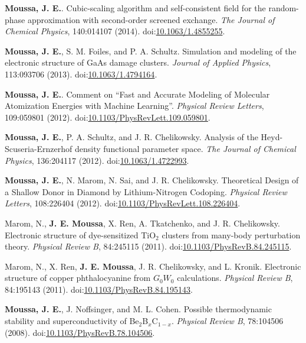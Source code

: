 \documentclass[10pt]{article}
\makeatletter
\newlength{\bibhang}
\newlength{\bibsep}
 {\@listi \global\bibsep\itemsep \global\advance\bibsep by\parsep}
\newenvironment{bibsection}%
        {\vspace{-1.6\baselineskip}\begin{etaremune}[leftmargin=1.6em]{%
       \setlength{\leftmargin}{\bibhang}%
       \setlength{\itemindent}{-\leftmargin}%
       \setlength{\itemsep}{\bibsep}%
       \setlength{\parsep}{\z@}%
        \setlength{\partopsep}{0pt}%
        \setlength{\topsep}{0pt}}}
        {\end{etaremune}\vspace{-.6\baselineskip}}
\newcommand\doilink[1]{\href{http://dx.doi.org/#1}{#1}}
\newcommand\doi[1]{doi:\doilink{#1}}
\makeatother
\begin{document}
\begin{bibsection}
    \item \textbf{Moussa, J. E.}. Cubic-scaling algorithm and self-consistent field for the random-phase approximation with second-order screened exchange.
     \emph{The Journal of Chemical Physics}, 140:014107 (2014). \doi{10.1063/1.4855255}.

    \item \textbf{Moussa, J. E.}, S. M. Foiles, and P. A. Schultz.
         Simulation and modeling of the electronic structure of GaAs damage clusters.
         \emph{Journal of Applied Physics}, 113:093706 (2013). \doi{10.1063/1.4794164}.

    \item \textbf{Moussa, J. E.}.
         Comment on ``Fast and Accurate Modeling of Molecular Atomization Energies with Machine Learning''.
         \emph{Physical Review Letters}, 109:059801 (2012). \doi{10.1103/PhysRevLett.109.059801}.

    \item \textbf{Moussa, J. E.}, P. A. Schultz, and J. R. Chelikowsky.
         Analysis of the Heyd-Scuseria-Ernzerhof density functional parameter space.
         \emph{The Journal of Chemical Physics}, 136:204117 (2012). \doi{10.1063/1.4722993}.

    \item \textbf{Moussa, J. E.}, N. Marom, N. Sai, and J. R. Chelikowsky.
         Theoretical Design of a Shallow Donor in Diamond by Lithium-Nitrogen Codoping.
         \emph{Physical Review Letters}, 108:226404 (2012). \doi{10.1103/PhysRevLett.108.226404}.

    \item Marom, N., \textbf{J. E. Moussa}, X. Ren, A. Tkatchenko, and J. R. Chelikowsky.
         Electronic structure of dye-sensitized TiO$_2$ clusters from many-body perturbation theory.
         \emph{Physical Review B}, 84:245115 (2011). \doi{10.1103/PhysRevB.84.245115}.

    \item Marom, N., X. Ren, \textbf{J. E. Moussa}, J. R. Chelikowsky, and L. Kronik.
         Electronic structure of copper phthalocyanine from $G_0 W_0$ calculations.
         \emph{Physical Review B}, 84:195143 (2011). \doi{10.1103/PhysRevB.84.195143}.

    \item \textbf{Moussa, J. E.}, J. Noffsinger, and M. L. Cohen.
         Possible thermodynamic stability and superconductivity of Be$_2$B$_x$C$_{1-x}$.
         \emph{Physical Review B}, 78:104506 (2008). \doi{10.1103/PhysRevB.78.104506}.


\end{bibsection}
\end{document}
